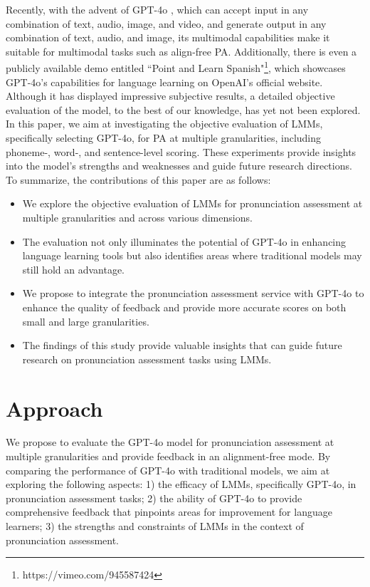 \documentclass{Interspeech}
\begin{document}
Recently, with the advent of GPT-4o \cite{openai2024gpt4o}, which can accept input in any combination of text, audio, image, and video, and generate output in any combination of text, audio, and image, its multimodal capabilities make it suitable for multimodal tasks such as align-free PA. Additionally, there is even a publicly available demo entitled ``Point and Learn Spanish"\footnote{https://vimeo.com/945587424}, which showcases GPT-4o's capabilities for language learning on OpenAI's official website. Although it has displayed impressive subjective results, a detailed objective evaluation of the model, to the best of our knowledge, has yet not been explored. In this paper, we aim at investigating the objective evaluation of LMMs, specifically selecting GPT-4o, for PA at multiple granularities, including phoneme-, word-, and sentence-level scoring. These experiments provide insights into the model's strengths and weaknesses and guide future research directions. To summarize, the contributions of this paper are as follows:

\begin{itemize}[leftmargin=2em]
  \item We explore the objective evaluation of LMMs for pronunciation assessment at multiple granularities and across various dimensions.
  \item The evaluation not only illuminates the potential of GPT-4o in enhancing language learning tools but also identifies areas where traditional models may still hold an advantage.
  \item We propose to integrate the pronunciation assessment service with GPT-4o to enhance the quality of feedback and provide more accurate scores on both small and large granularities.
  \item The findings of this study provide valuable insights that can guide future research on pronunciation assessment tasks using LMMs.
  \end{itemize}

\section{Approach}

We propose to evaluate the GPT-4o model for pronunciation assessment at multiple granularities and provide feedback in an alignment-free mode. By comparing the performance of GPT-4o with traditional models, we aim at exploring the following aspects: 1) the efficacy of LMMs, specifically GPT-4o, in pronunciation assessment tasks; 2) the ability of GPT-4o to provide comprehensive feedback that pinpoints areas for improvement for language learners; 3) the strengths and constraints of LMMs in the context of pronunciation assessment.
\end{document}
